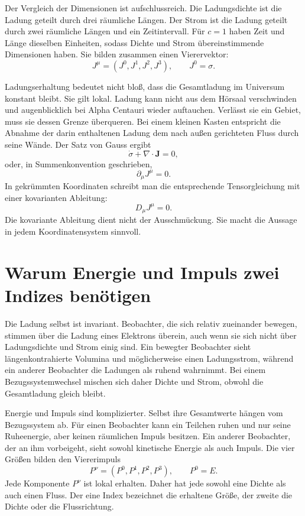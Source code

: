 Der Vergleich der Dimensionen ist aufschlussreich. Die Ladungsdichte ist die Ladung geteilt durch drei räumliche Längen. Der Strom ist die Ladung geteilt durch zwei räumliche Längen und ein Zeitintervall. Für \(c=1\) haben Zeit und Länge dieselben Einheiten, sodass Dichte und Strom übereinstimmende Dimensionen haben. Sie bilden zusammen einen Vierervektor:
\begin{equation}
 J^\mu=(J^0,J^1,J^2,J^3),
 \qquad J^0=\sigma.
\end{equation}

Ladungserhaltung bedeutet nicht bloß, dass die Gesamtladung im Universum konstant bleibt. Sie gilt lokal. Ladung kann nicht aus dem Hörsaal verschwinden und augenblicklich bei Alpha Centauri wieder auftauchen. Verlässt sie ein Gebiet, muss sie dessen Grenze überqueren. Bei einem kleinen Kasten entspricht die Abnahme der darin enthaltenen Ladung dem nach außen gerichteten Fluss durch seine Wände. Der Satz von Gauss ergibt
\begin{equation}
 \dot{\sigma}+\nabla\cdot\mathbf{J}=0,
\end{equation}
oder, in Summenkonvention geschrieben,
\begin{equation}
 \partial_\mu J^\mu=0.
 \label{eq:charge-continuity}
\end{equation}
In gekrümmten Koordinaten schreibt man die entsprechende Tensorgleichung mit einer kovarianten Ableitung:
\begin{equation}
 D_\mu J^\mu=0.
\end{equation}
Die kovariante Ableitung dient nicht der Ausschmückung. Sie macht die Aussage in jedem Koordinatensystem sinnvoll.

\section{Warum Energie und Impuls zwei Indizes benötigen}

Die Ladung selbst ist invariant. Beobachter, die sich relativ zueinander bewegen, stimmen über die Ladung eines Elektrons überein, auch wenn sie sich nicht über Ladungsdichte und Strom einig sind. Ein bewegter Beobachter sieht längenkontrahierte Volumina und möglicherweise einen Ladungsstrom, während ein anderer Beobachter die Ladungen als ruhend wahrnimmt. Bei einem Bezugssystemwechsel mischen sich daher Dichte und Strom, obwohl die Gesamtladung gleich bleibt.

Energie und Impuls sind komplizierter. Selbst ihre Gesamtwerte hängen vom Bezugssystem ab. Für einen Beobachter kann ein Teilchen ruhen und nur seine Ruheenergie, aber keinen räumlichen Impuls besitzen. Ein anderer Beobachter, der an ihm vorbeigeht, sieht sowohl kinetische Energie als auch Impuls. Die vier Größen bilden den Viererimpuls
\begin{equation}
 P^\nu=(P^0,P^1,P^2,P^3),
 \qquad P^0=E.
\end{equation}
Jede Komponente \(P^\nu\) ist lokal erhalten. Daher hat jede sowohl eine Dichte als auch einen Fluss. Der eine Index bezeichnet die erhaltene Größe, der zweite die Dichte oder die Flussrichtung.

